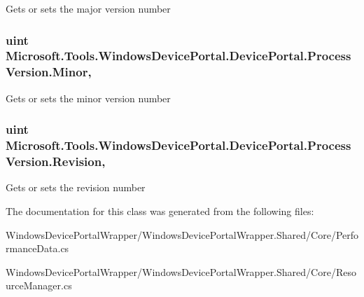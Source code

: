 Gets or sets the major version number 

\subsubsection[{\texorpdfstring{Minor}{Minor}}]{\setlength{\rightskip}{0pt plus 5cm}uint Microsoft.\+Tools.\+Windows\+Device\+Portal.\+Device\+Portal.\+Process\+Version.\+Minor\hspace{0.3cm}{\ttfamily [get]}, {\ttfamily [set]}}\hypertarget{class_microsoft_1_1_tools_1_1_windows_device_portal_1_1_device_portal_1_1_process_version_a155ceb8148677ec286501bcc4e129188}{}\label{class_microsoft_1_1_tools_1_1_windows_device_portal_1_1_device_portal_1_1_process_version_a155ceb8148677ec286501bcc4e129188}


Gets or sets the minor version number 

\subsubsection[{\texorpdfstring{Revision}{Revision}}]{\setlength{\rightskip}{0pt plus 5cm}uint Microsoft.\+Tools.\+Windows\+Device\+Portal.\+Device\+Portal.\+Process\+Version.\+Revision\hspace{0.3cm}{\ttfamily [get]}, {\ttfamily [set]}}\hypertarget{class_microsoft_1_1_tools_1_1_windows_device_portal_1_1_device_portal_1_1_process_version_ab666b05e801c9c312bf09c06dff90fdc}{}\label{class_microsoft_1_1_tools_1_1_windows_device_portal_1_1_device_portal_1_1_process_version_ab666b05e801c9c312bf09c06dff90fdc}


Gets or sets the revision number 



The documentation for this class was generated from the following files\+:\begin{DoxyCompactItemize}
\item 
Windows\+Device\+Portal\+Wrapper/\+Windows\+Device\+Portal\+Wrapper.\+Shared/\+Core/Performance\+Data.\+cs\item 
Windows\+Device\+Portal\+Wrapper/\+Windows\+Device\+Portal\+Wrapper.\+Shared/\+Core/Resource\+Manager.\+cs\end{DoxyCompactItemize}
